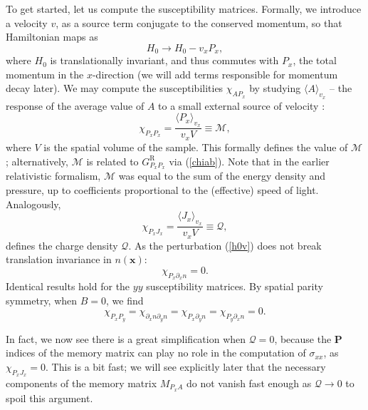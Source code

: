 \documentclass[10pt, oneside]{book}
\begin{document}
\begin{doublespace}
To get started, let us compute the susceptibility matrices. Formally, we introduce a velocity $v$, as a source term conjugate to the conserved momentum, so that Hamiltonian maps as
\begin{equation}
H_0 \rightarrow H_0 -  v_x P_x,   \label{h0v}
\end{equation}
where $H_0$ is translationally invariant, and thus commutes with $P_x$, the total momentum in the $x$-direction (we will add terms responsible for momentum decay later).
We may compute the susceptibilities $\chi_{AP_x}$ by studying $\langle A\rangle_{v_x}$ -- the response of the average value of $A$ to a small external source of velocity \cite{Kadanoff1963419}:   \begin{equation}
\chi_{P_xP_x} = \frac{\langle P_x\rangle_{v_x}}{v_x V} \equiv \mathcal{M}, \label{defM}
\end{equation}
where $V$ is the spatial volume of the sample.   This formally defines the value of $\mathcal{M}$;  alternatively, $\mathcal{M}$ is related to $G^{\mathrm{R}}_{P_xP_x}$ via (\ref{chiab}).   Note that in the earlier relativistic formalism, $\mathcal{M}$ was equal to the sum of the energy
density and pressure, up to coefficients proportional to the (effective) speed of light.
Analogously, \begin{equation}
\chi_{P_xJ_x} = \frac{\langle J_x\rangle_{v_x}}{v_xV} \equiv \mathcal{Q}, \label{defQ}
\end{equation}
defines the charge density $\mathcal{Q}$.
As the perturbation (\ref{h0v}) does not break translation invariance in $n(\mathbf{x})$: \begin{equation}
\chi_{P_x\partial_x n} = 0.
\end{equation}
Identical results hold for the $yy$ susceptibility matrices.
By spatial parity symmetry, when $B=0$, we find \begin{equation}
\chi_{P_xP_y} = \chi_{\partial_x n \partial_y n} = \chi_{P_x\partial_y n}  = \chi_{P_y\partial_x n} = 0.
\end{equation}

In fact, we now see there is a great simplification when $\mathcal{Q}=0$, because the $\mathbf{P}$ indices of the memory matrix can play no role in the computation of $\sigma_{xx}$, as $\chi_{P_xJ_x}=0$.   This is a bit fast; we will see explicitly later that the necessary components of the memory matrix $M_{P_xA}$ do not vanish fast enough as $\mathcal{Q}\rightarrow 0$ to spoil this argument.



\end{doublespace}
\end{document}

